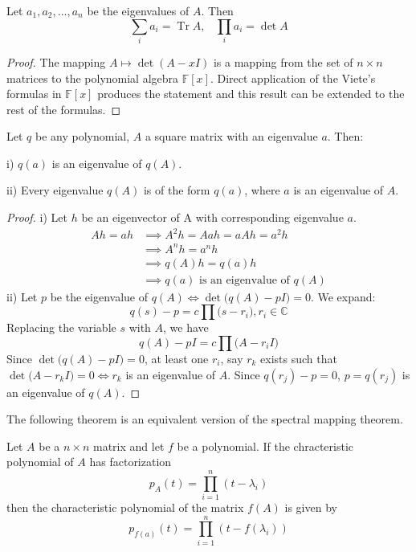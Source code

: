 \documentclass{article}
\DeclareMathOperator{\Tr}{Tr}
\begin{document}
    \begin{theorem} 
    Let $a_1, a_2, ..., a_n$ be the eigenvalues of $A$. Then 
    \[\sum_i a_i = \Tr{A}, \;\;\; \prod_i a_i = \det{A}\]
    \end{theorem}

    \begin{proof}
    The mapping $A \mapsto \det{(A - x I)}$ is a mapping from the set of $n \times n$ matrices to the polynomial algebra $\mathbb{F}[x]$. Direct application of the Viete's formulas in $\mathbb{F}[x]$ produces the statement and this result can be extended to the rest of the formulas. 
    \end{proof}

    \begin{theorem}
    Let $q$ be any polynomial, $A$ a square matrix with an eigenvalue $a$. Then: 

    i) $q(a)$ is an eigenvalue of $q(A)$. 

    ii) Every eigenvalue $q(A)$ is of the form $q(a)$, where $a$ is an eigenvalue of $A$. 
    \end{theorem}
    \begin{proof} 
    i) Let $h$ be an eigenvector of A with corresponding eigenvalue $a$. 
    \begin{align*}
        Ah = ah & \implies A^{2} h = Aah = aAh = a^{2} h \\
     & \implies A^{n} h = a^{n} h   \\
     & \implies q(A)h = q(a)h \\
     & \implies q(a) \text{ is an eigenvalue of }q(A)
    \end{align*}
    ii) Let $p$ be the eigenvalue of $q(A) \iff \det{\big(q(A) - p I\big)} = 0$. We expand: 
    $$ q(s) - p = c\prod \big(s-r_{i}\big), r_{i} \in \mathbb{C} $$ 
    Replacing the variable $s$ with $A$, we have
    $$ q(A) - pI = c \prod \big(A-r_{i}I\big) $$
    Since $\det{\big( q(A) - pI\big)} = 0$, at least one $r_{i}$, say $r_{k}$ exists such that $\det{\big( A - r_{k} I \big)} = 0 \iff r_{k}$ is an eigenvalue of $A$. Since $q(r_{j})-p = 0$, $p = q(r_{j})$ is an eigenvalue of $q(A)$. 
    \end{proof}

    The following theorem is an equivalent version of the spectral mapping theorem.
    \begin{theorem}
    Let $A$ be a $n \times n$ matrix and let $f$ be a polynomial. If the chracteristic polynomial of $A$ has factorization 
    \[p_A (t) = \prod_{i = 1}^n (t - \lambda_i)\]
    then the characteristic polynomial of the matrix $f(A)$ is given by 
    \[p_{f(a)} (t) = \prod_{i = 1}^n (t - f(\lambda_i))\]
    \end{theorem}
\end{document}
